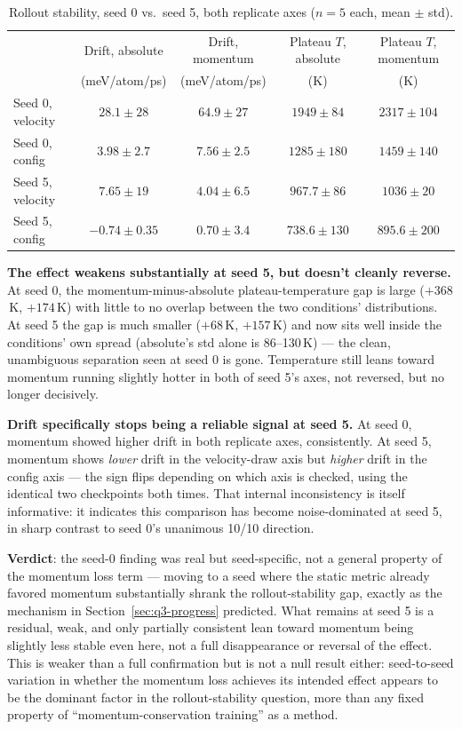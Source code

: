 \documentclass[11pt]{article}
\begin{document}
\begin{table}[h]
\centering
\caption{Rollout stability, seed 0 vs.\ seed 5, both replicate axes
($n=5$ each, mean $\pm$ std).}
\label{tab:seed5-comparison}
\begin{tabular}{lcccc}
\toprule
& Drift, absolute & Drift, momentum & Plateau $T$, absolute & Plateau $T$, momentum \\
& (meV/atom/ps) & (meV/atom/ps) & (K) & (K) \\
\midrule
Seed 0, velocity & $28.1 \pm 28$ & $64.9 \pm 27$ & $1949 \pm 84$ & $2317 \pm 104$ \\
Seed 0, config    & $3.98 \pm 2.7$ & $7.56 \pm 2.5$ & $1285 \pm 180$ & $1459 \pm 140$ \\
Seed 5, velocity  & $7.65 \pm 19$ & $\mathbf{4.04 \pm 6.5}$ & $967.7 \pm 86$ & $1036 \pm 20$ \\
Seed 5, config    & $-0.74 \pm 0.35$ & $0.70 \pm 3.4$ & $738.6 \pm 130$ & $895.6 \pm 200$ \\
\bottomrule
\end{tabular}
\end{table}

\textbf{The effect weakens substantially at seed 5, but doesn't cleanly
reverse.} At seed 0, the momentum-minus-absolute plateau-temperature gap is
large ($+368$\,K, $+174$\,K) with little to no overlap between the two
conditions' distributions. At seed 5 the gap is much smaller ($+68$\,K,
$+157$\,K) and now sits well inside the conditions' own spread (absolute's
std alone is 86--130\,K) --- the clean, unambiguous separation seen at
seed 0 is gone. Temperature still leans toward momentum running slightly
hotter in both of seed 5's axes, not reversed, but no longer decisively.

\textbf{Drift specifically stops being a reliable signal at seed 5.} At
seed 0, momentum showed higher drift in both replicate axes, consistently.
At seed 5, momentum shows \emph{lower} drift in the velocity-draw axis but
\emph{higher} drift in the config axis --- the sign flips depending on which
axis is checked, using the identical two checkpoints both times. That
internal inconsistency is itself informative: it indicates this comparison
has become noise-dominated at seed 5, in sharp contrast to seed 0's
unanimous 10/10 direction.

\textbf{Verdict}: the seed-0 finding was real but seed-specific, not a
general property of the momentum loss term --- moving to a seed where the
static metric already favored momentum substantially shrank the
rollout-stability gap, exactly as the mechanism in
Section~\ref{sec:q3-progress} predicted. What remains at seed 5 is a
residual, weak, and only partially consistent lean toward momentum being
slightly less stable even here, not a full disappearance or reversal of the
effect. This is weaker than a full confirmation but is not a null result
either: seed-to-seed variation in whether the momentum loss achieves its
intended effect appears to be the dominant factor in the rollout-stability
question, more than any fixed property of ``momentum-conservation training''
as a method.
\end{document}
